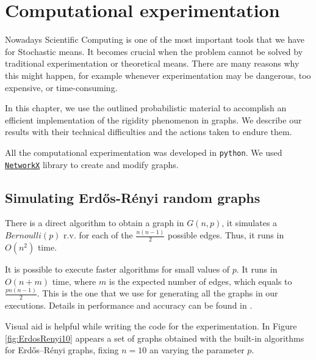 
\chapter{Computational experimentation} %

\label{Chapter3} %



Nowadays Scientific Computing is one of the most important tools that we have for Stochastic means. It becomes crucial when the problem cannot be solved by traditional experimentation or theoretical means. There are many reasons why this might happen, for example whenever experimentation may be dangerous, too expensive, or time-consuming.

In this chapter, we use the outlined probabilistic material to accomplish an efficient implementation of the rigidity phenomenon in graphs. We describe our results with their technical difficulties and the actions taken to endure them.

All the computational experimentation was developed in \texttt{python}. We used \texttt{\href{https://networkx.github.io/}{NetworkX}} library to create and modify graphs.

\section{Simulating Erdős-Rényi random graphs}

There is a direct algorithm to obtain a graph in $G(n,p)$, it simulates a $Bernoulli(p)$ r.v. for each of the $\frac{n(n-1)}{2}$ possible edges. Thus, it runs in $O(n^2)$ time. 

It is possible to execute faster algorithms for small values of $p$. It runs in $O(n + m)$ time, where $m$ is the expected number of edges, which equals to $\frac{pn(n - 1)}{2}$. This is the one that we use for generating all the graphs in our executions. Details in performance and accuracy can be found in \cite[Batagelj, Brandes 05]{fastER}.

Visual aid is helpful while writing the code for the experimentation. In Figure \ref{fig:ErdosRenyi10} appears a set of graphs obtained with the built-in algorithms for Erdős–Rényi graphs, fixing $n=10$ an varying the parameter $p$.

